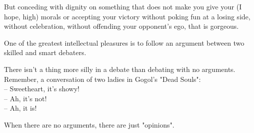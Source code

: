 But conceding with dignity on something that does not make you give your (I hope, high) morals or accepting your victory without poking fun at a losing side, without celebration, without offending your opponent's ego, that is gorgeous.

One of the greatest intellectual pleasures is to follow an argument between two skilled and smart debaters.

There isn't a thing more silly in a debate than debating with no arguments. Remember, a conversation of two ladies in Gogol's "Dead Souls":\\

-- Sweetheart, it's showy!\\
-- Ah, it's not!\\
-- Ah, it is!

When there are no arguments, there are just "opinions".